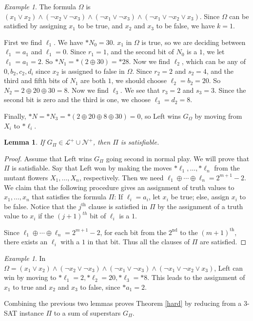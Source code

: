 \documentclass{amsart}
\theoremstyle{plain}
\newtheorem{lemma}[thm]{Lemma}
\theoremstyle{definition}
\theoremstyle{remark}
\newtheorem{ex}[thm]{Example}
\numberwithin{equation}{section}
\numberwithin{thm}{section}
\begin{document}
\begin{ex}
    The formula $\Omega$ is $(x_1 \lor x_2 ) \land (\neg x_2 \lor \neg x_3) \land (\neg x_1 \lor \neg x_3) \land (\neg x_1 \lor \neg x_2 \lor x_3 )$. Since $\Omega$ can be satisfied by assigning $x_1$ to be true, and $x_2$ and $x_3$ to be false, we have $k = 1$. 

First we find $\ell_1$. We have $*N_0 = 30$. $x_1$ in $\Omega$ is true, so we are deciding between $\ell_1 = a_1$ and $\ell_1 = 0$.  Since $r_1 = 1$, and the second bit of $N_0$ is a $1$, we let $\ell_1 = a_1 = 2$. So $*N_1 = *(2 \oplus 30) = *28 $. Now we find $\ell_2$, which can be any of $0,b_2,c_2,d_i$ since $x_2$ is assigned to false in $\Omega$. Since $r_2 = 2$ and $s_2 = 4$, and the third and fifth bits of $N_1$ are both $1$, we should choose $\ell_2 = b_2 = 20$. So $N_2 = 2 \oplus 20\oplus30=8$. Now we find $\ell_3$. We see that $r_3 = 2$ and $s_3 = 3$. Since the second bit is zero and the third is one, we choose $\ell_3 = d_2 = 8$. 
    
      Finally, $*N = *N_3 =*(2 \oplus 20 \oplus 8 \oplus 30) = 0 $, so Left wins $G_{\Omega}$ by moving from $X_i$ to $*\ell_i$.
\end{ex}
\begin{lemma}
    If $G_{\Pi} \in\mathcal{L}^+ \cup \mathcal{N}^+$, then $\Pi$ is satisfiable.
\end{lemma}
\begin{proof}
    Assume that Left wins $G_{\Pi}$ going second in normal play. We will prove that $\Pi$ is satisfiable. Say that Left won by making the moves $*\ell_1,\ldots,*\ell_n$ from the mutant flowers $X_1,\dots,X_n$, respectively. Then we need $\ell_1\oplus \cdots \oplus \ell_n= 2^{m+1}-2$. 
We claim that the following procedure gives an assignment of truth values to $x_1,\dots,x_n$ that satisfies the formula $\Pi$: If $\ell_i = a_i$, let $x_i$ be true; else, assign $x_i$ to be false. 
Notice that the $j^{\text{th}}$ clause is satisfied in $\Pi$ by the assignment of a truth value to $x_i$ if the $(j+1)^{th}$ bit of $\ell_i$ is a $1$. 

Since $\ell_1\oplus \cdots \oplus \ell_n= 2^{m+1}-2$, for each bit from the $2^{\text{nd}}$ to the $(m+1)^{\text{th}}$, there exists an $\ell_i$ with a $1$ in that bit. Thus all the clauses of $\Pi$ are satisfied.
\end{proof}
\begin{ex}
In $\Omega= (x_1 \lor x_2 ) \land (\neg x_2 \lor \neg x_3) \land (\neg x_1 \lor \neg x_3) \land (\neg x_1 \lor \neg x_2 \lor x_3 )$, Left can win by moving to $*\ell_1 = 2,*\ell_2 = 20,*\ell_3 = *8$. This leads to the assignment of $x_1$ to true and $x_2$ and $x_3$ to false, since $*a_1 = 2$.
\end{ex}
Combining the previous two lemmas proves Theorem \ref{hard} by reducing from a 3-\textsc{SAT} instance $\Pi$ to a sum of superstars $G_{\Pi}$.
\end{document}
